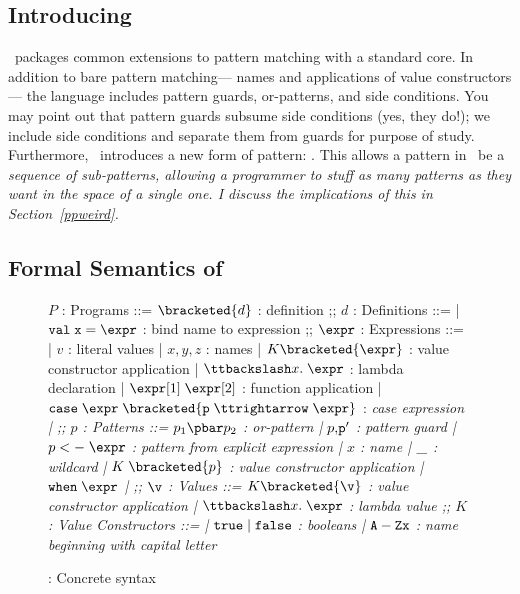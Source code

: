 \documentclass[manuscript,screen,review, 12pt, nonacm]{acmart}
\begin{document}
\subsection{Introducing \PPlus}
\label{pplus}

    \PPlus\ packages common extensions to pattern matching with a standard core.
    In addition to bare pattern matching— names and applications of value
    constructors— the language includes pattern guards, or-patterns, and side
    conditions. You may point out that pattern guards subsume side conditions
    (yes, they do!); we include side conditions and separate them from guards
    for purpose of study. Furthermore, \PPlus\ introduces a new form of pattern:
    \pcommap. This allows a pattern in \PPlus\ be a \it{sequence} of
    sub-patterns, allowing a programmer to stuff as many patterns as they want
    in the space of a single one. I discuss the implications of this in
    Section~\ref{ppweird}.

\subsection{Formal Semantics of \PPlus}

\begin{figure}
\begin{center}
\begin{bnf}
$P$ : \textsf{Programs} ::=
$\bracketed{d}$ : definition
;;
$d$ : \textsf{Definitions} ::=
| $\tt{val}\; x\; \tt{=}\; \expr$ : bind name to expression
;;
$\expr$ : Expressions ::= 
| $v$ : literal values 
| $x, y, z$ : names
| $K\bracketed{\expr}$ : value constructor application 
| $\ttbackslash x.\; \expr$ : lambda declaration  
| $\expr[1]\; \expr[2]$ : function application 
| $\tt{case}\; \expr\; \bracketed{p\; \ttrightarrow\; \expr}$ : \it{case} expression 
| \ttbraced{$\expr$}
;;
$p$ : \textsf{Patterns} ::= $p_{1}\pbar p_{2}$ : or-pattern
| $p \tt{,} p'$ : pattern guard 
| $p\; \tt{<-}\; \expr$ : pattern from explicit expression  
| $x$ : name 
| $\tt{\_}$ : wildcard 
| $K\; \bracketed{p}$ : value constructor application 
| $\tt{when}\; \expr$
| 
;;
$\v$ : Values ::= $K\bracketed{\v}$ : value constructor application 
| $\ttbackslash x.\; \expr$ : lambda value 
;;
$K$ : \textsf{Value Constructors} ::=
| $\tt{true}\; \vert\; \tt{false}$ : booleans
| $\tt{A-Z}x$ : name beginning with capital letter
\end{bnf}
\end{center}
\caption{\PPlus: Concrete syntax}
\label{fig:ppsyntax}
\end{figure}
\end{document}

